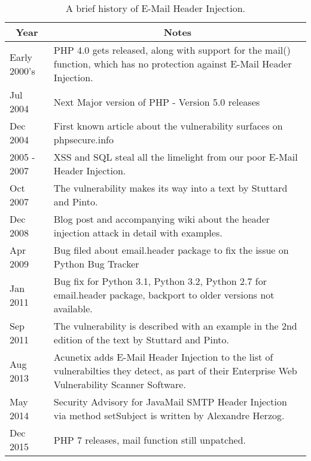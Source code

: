 \begin{table}[!htbp]
	\centering
	\begin{tabular}{|p{2cm}|p{12cm}|}
		\hline
		\multicolumn{1}{|c|}{\textbf{Year}} & \multicolumn{1}{c|}{\textbf{ Notes}}\\
		\hline

		{Early 2000's } & { PHP 4.0 gets released, along with support for the mail() function, which has no protection against E-Mail Header Injection.}\\
		\hline

		{Jul 2004} & { Next Major version of PHP - Version 5.0 releases}\\
		\hline

		{Dec 2004} & { First known article about the vulnerability surfaces on phpsecure.info}\\
		\hline

		{2005 - 2007} & {XSS and SQL steal all the limelight from our poor E-Mail Header Injection.}\\
		\hline

		{Oct 2007} & {The vulnerability makes its way into a text by Stuttard and Pinto. }\\
		\hline

		{Dec 2008} & {Blog post and accompanying wiki about the header injection attack in detail with examples.}\\
		\hline

		{Apr 2009} & {Bug filed about email.header package to fix the issue on Python Bug Tracker}\\
		\hline

		{Jan 2011} & {Bug fix for Python 3.1, Python 3.2, Python 2.7 for email.header package, backport to older versions not available.}\\
		\hline

		{Sep 2011} & {The vulnerability is described with an example in the 2nd edition of the text by Stuttard and Pinto.}\\
		\hline

		{Aug 2013} & {Acunetix adds E-Mail Header Injection to the list of vulnerabilties they detect, as part of their Enterprise Web Vulnerability Scanner Software.}\\
		\hline

		{May 2014} & {Security Advisory for JavaMail SMTP Header Injection via method setSubject is written by Alexandre Herzog.}\\
		\hline

		{Dec 2015}  & {PHP 7 releases, mail function still unpatched.}\\
		\hline
	\end{tabular}
	\caption{A brief history of E-Mail Header Injection.}
	\label{tab:history}
\end{table}
